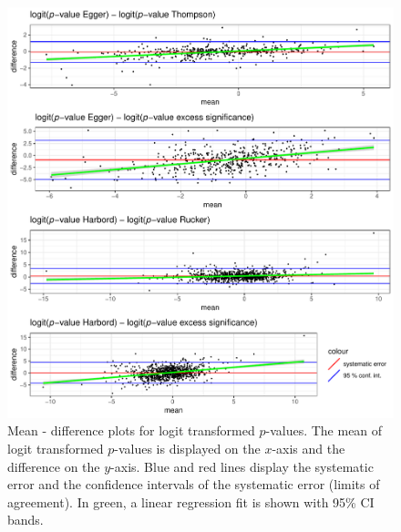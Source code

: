 \documentclass[11pt,a4paper,twoside]{book}\usepackage[]{graphicx}\usepackage[]{color}
\newenvironment{knitrout}{}{} %
\begin{document}
\begin{figure}
\begin{knitrout}
\color{fgcolor}

{\centering \includegraphics[width=\textwidth-3cm]{figure/ch03_figunnamed-chunk-16-1} 

}



\end{knitrout}
\caption{Mean - difference plots for logit transformed $p$-values. The mean of logit transformed $p$-values is displayed on the $x$-axis and the difference on the $y$-axis. Blue and red lines display the systematic error and the confidence intervals of the systematic error (limits of agreement).
In green, a linear regression fit is shown with 95\% CI bands.}
\label{fig:mean.diff.test}
\end{figure}
\end{document}
